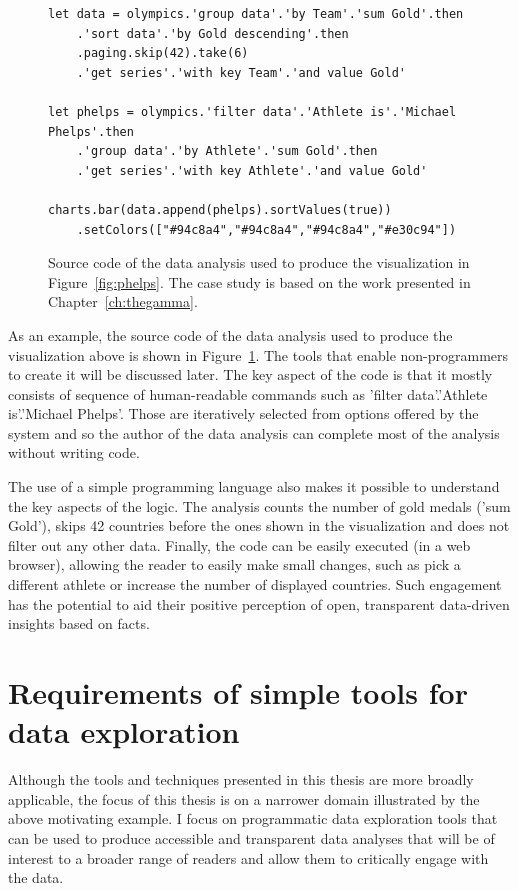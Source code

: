 \documentclass[fleqn,11pt]{report}
\newcommand{\ident}[1]{\textnormal{\ttfamily #1}}
\theoremstyle{definition}
\begin{document}
\begin{figure}[t]
\begin{lstlisting}[language=thegamma]
let data = olympics.'group data'.'by Team'.'sum Gold'.then
    .'sort data'.'by Gold descending'.then
    .paging.skip(42).take(6)
    .'get series'.'with key Team'.'and value Gold'

let phelps = olympics.'filter data'.'Athlete is'.'Michael Phelps'.then
    .'group data'.'by Athlete'.'sum Gold'.then
    .'get series'.'with key Athlete'.'and value Gold'

charts.bar(data.append(phelps).sortValues(true))
    .setColors(["#94c8a4","#94c8a4","#94c8a4","#e30c94"])
\end{lstlisting}
\caption{Source code of the data analysis used to produce the visualization in
Figure~\ref{fig:phelps}. The case study is based on the work presented in Chapter~\ref{ch:thegamma}.}
\label{fig:gamma}
\end{figure}

As an example, the source code of the data analysis used to produce the visualization above is shown
in Figure~\ref{fig:gamma}. The tools that enable non-programmers to create it will be discussed
later. The key aspect of the code is that it mostly consists of sequence of human-readable
commands such as \ident{'filter data'.'Athlete is'.'Michael Phelps'}. Those are iteratively
selected from options offered by the system and so the author of the data analysis can complete
most of the analysis without writing code.

The use of a simple programming language also makes it possible to understand the key
aspects of the logic. The analysis counts the number of gold medals (\ident{'sum Gold'}),
skips 42 countries before the ones shown in the visualization and does not filter out any
other data. Finally, the code can be easily executed (in a web browser), allowing the reader
to easily make small changes, such as pick a different athlete or increase the number of displayed
countries. Such engagement has the potential to aid their positive perception of open, transparent
data-driven insights based on facts.

\section{Requirements of simple tools for data exploration}

Although the tools and techniques presented in this thesis are more broadly applicable,
the focus of this thesis is on a narrower domain illustrated by the above motivating example.
I focus on programmatic data exploration tools that can be used to produce accessible and
transparent data analyses that will be of interest to a broader range of readers and allow
them to critically engage with the data.
\end{document}
